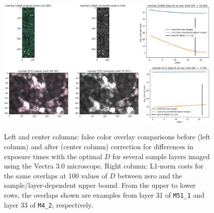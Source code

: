 \documentclass[letterpaper,11pt]{article}
\begin{document}
\begin{figure}[!ht]
\centering
\includegraphics[width=0.98\textwidth]{images/methods/cost_examples_vectra/overlay_comp_random_10478_offset=17.778}
\includegraphics[width=0.98\textwidth]{images/methods/cost_examples_vectra/overlay_comp_random_892_offset=21.314}
\caption{\footnotesize Left and center columns: false color overlay comparisons before (left column) and after (center column) correction for differences in exposure times with the optimal $D$ for several sample layers imaged using the Vectra 3.0 microscope. Right column: L1-norm costs for the same overlaps at 100 values of $D$ between zero and the sample/layer-dependent upper bound. From the upper to lower rows, the overlaps shown are examples from layer 31 of \texttt{M51\_1} and layer 33 of \texttt{M4\_2}, respectively.}
\label{fig:overlap_cost_examples_vectra_2}
\end{figure}
\end{document}
